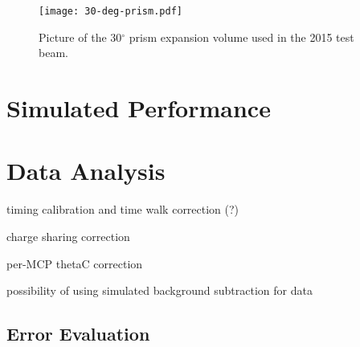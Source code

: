 \begin{figure}[ht]
	\centering
	\texttt{[image: 30-deg-prism.pdf]}
	\caption{Picture of the 30$^\circ$ prism expansion volume used in the 2015 test beam.}
	\label{fig:prototype_prism}
\end{figure}


\section{Simulated Performance}

\section{Data Analysis}
timing calibration and time walk correction (?)

charge sharing correction

per-MCP thetaC correction

possibility of using simulated background subtraction for data

\subsection{Error Evaluation}